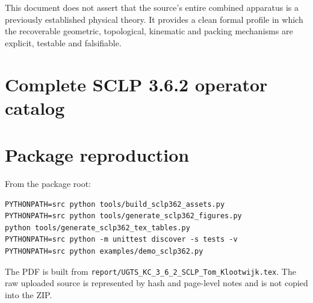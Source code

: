 \documentclass[10pt,a4paper]{article}
\newcommand{\code}[1]{\texttt{#1}}
\begin{document}
\begin{boundbox}
This document does not assert that the source's entire combined apparatus is a previously established physical theory. It provides a clean formal profile in which the recoverable geometric, topological, kinematic and packing mechanisms are explicit, testable and falsifiable.
\end{boundbox}

\clearpage
\appendix
\section{Complete SCLP 3.6.2 operator catalog}


\section{Package reproduction}
From the package root:
\begin{Verbatim}[breaklines=true,fontsize=\small]
PYTHONPATH=src python tools/build_sclp362_assets.py
PYTHONPATH=src python tools/generate_sclp362_figures.py
python tools/generate_sclp362_tex_tables.py
PYTHONPATH=src python -m unittest discover -s tests -v
PYTHONPATH=src python examples/demo_sclp362.py
\end{Verbatim}
The PDF is built from \code{report/UGTS\_KC\_3\_6\_2\_SCLP\_Tom\_Klootwijk.tex}. The raw uploaded source is represented by hash and page-level notes and is not copied into the ZIP.
\end{document}
